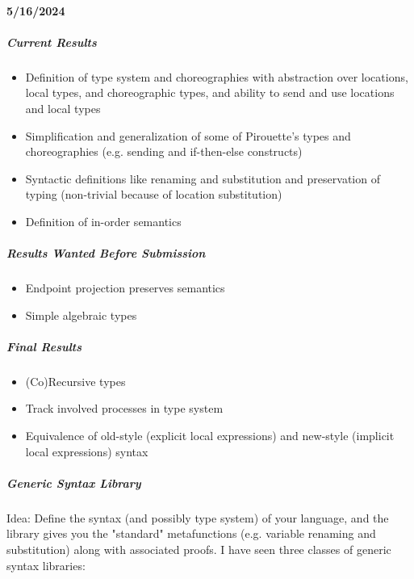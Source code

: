 \documentclass{article}
\theoremstyle{definition}
\begin{document}
\paragraph{5/16/2024}
\subparagraph{Current Results}
\begin{itemize}
	\item Definition of type system and choreographies with abstraction over locations, local types, and choreographic types, and ability to send and use locations and local types
	\item Simplification and generalization of some of Pirouette's types and choreographies (e.g. sending and if-then-else constructs)
	\item Syntactic definitions like renaming and substitution and preservation of typing (non-trivial because of location substitution)
	\item Definition of in-order semantics
\end{itemize}
\subparagraph{Results Wanted Before Submission}
\begin{itemize}
	\item Endpoint projection preserves semantics
	\item Simple algebraic types
\end{itemize}
\subparagraph{Final Results}
\begin{itemize}
	\item (Co)Recursive types
	\item Track involved processes in type system
	\item Equivalence of old-style (explicit local expressions) and new-style (implicit local expressions) syntax
\end{itemize}
\subparagraph{Generic Syntax Library} Idea: Define the syntax (and possibly type system) of your language, and the library gives you the "standard" metafunctions (e.g. variable renaming and substitution) along with associated proofs. I have seen three classes of generic syntax libraries:
\end{document}
